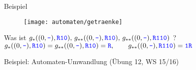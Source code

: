 {\begin{frame}{Beispiel}
	\begin{figure}[H]
		\texttt{[image: automaten/getraenke]}			
	\end{figure}
	Was ist $g_*((0,\word -), \word{R10}) , \, g_{**}((0,\word -),\word{R10}) , \, g_{**}((0,\word -),\word{R110}) $ ? \\ \pause
	$g_*((0,\word -),\word{R10}) = g_{**}((0,\word -),\word{R10}) = \word R, \qquad g_{**}((0,\word -),\word{R110}) = \word{1R} $	
\end{frame}

\begin{frame}{}
	Beispiel: Automaten-Umwandlung (Übung 12, WS 15/16)
\end{frame}


}